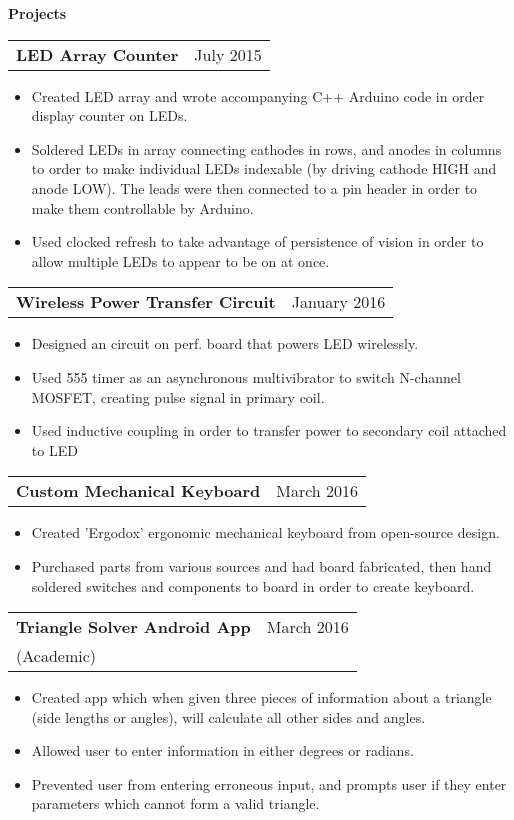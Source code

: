 \documentclass[letterpaper,10pt]{article}
\makeatletter
\newcommand{\resitem}[1]{\item #1 \vspace{-2pt}}
\newcommand{\resheading}[1]{{\large \colorbox{mygrey}{\begin{minipage}{\textwidth}{\textbf{#1 \vphantom{p\^{E}}}}\end{minipage}}}}
\newcommand{\ressubheading}[4]{
    \begin{tabular*}{7in}{l@{\extracolsep{\fill}}r}
    		\textbf{#1} & #2 \\
    		 #3 		& \textit{#4} \\
    \end{tabular*}\vspace{-6pt}}
\newcommand{\resshortsubheading}[2]{
    \begin{tabular*}{7in}{l@{\extracolsep{\fill}}r}
        \textbf{#1} & #2 \\
    \end{tabular*}\vspace{-6pt}}
\makeatother
\begin{document}
\resheading{Projects}
\begin{samepage}
    \resshortsubheading{LED Array Counter}{July 2015}
    \begin{itemize}
        \resitem{Created LED array and wrote accompanying C++ Arduino code in order display counter on LEDs.}
        \resitem{Soldered LEDs in array connecting cathodes in rows, and anodes in columns to order to make individual LEDs indexable (by driving cathode HIGH and anode LOW). The leads were then connected to a pin header in order to make them controllable by Arduino.}
        \resitem{Used clocked refresh to take advantage of persistence of vision in order to allow multiple LEDs to appear to be on at once. }
    \end{itemize}   
\end{samepage}
\begin{samepage}
    \resshortsubheading{Wireless Power Transfer Circuit}{January 2016}
    \begin{itemize}
        \resitem{Designed an circuit on perf. board that powers LED wirelessly. }
        \resitem{Used 555 timer as an asynchronous multivibrator to switch N-channel MOSFET, creating pulse signal in primary coil. }
        \resitem{Used inductive coupling in order to transfer power to secondary coil attached to LED}
    \end{itemize}
\end{samepage}
\pagebreak
\begin{samepage}
    \resshortsubheading{Custom Mechanical Keyboard}{March 2016}
    \begin{itemize}
        \resitem{Created 'Ergodox' ergonomic mechanical keyboard from open-source design.}
        \resitem{Purchased parts from various sources and had board fabricated, then hand soldered switches and components to board in order to create keyboard.}
    \end{itemize}
\end{samepage}
\begin{samepage}
    \ressubheading{Triangle Solver Android App}{March 2016}{(Academic)}{}
    \begin{itemize}
        \resitem{Created app which when given three pieces of information about a triangle (side lengths or angles), will calculate all other sides and angles.}
        \resitem{Allowed user to enter information in either degrees or radians.}
        \resitem{Prevented user from entering erroneous input, and prompts user if they enter parameters which cannot form a valid triangle.}
    \end{itemize} 
\end{samepage}
\end{document}
